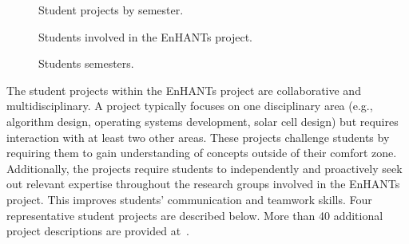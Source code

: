 \documentclass[journal,twopages]{IEEEtran}
\begin{document}
\begin{figure*}[t]
\centering
{}
\vspace*{-0.2cm}
\caption{\label{fig:studentsOverTime} Student projects by semester.}
\end{figure*}


\begin{figure}[t]
\centering
{}
\vspace*{-0.3cm}
\caption{\label{fig:studentBreakdown}Students involved in the EnHANTs project.}
\centering
\end{figure}

\begin{figure}[t]
\vspace*{-0.3cm}
\caption{\label{fig:studentSemesterBreakdown}Students semesters.}
\end{figure}


The student projects within the EnHANTs project are collaborative and multidisciplinary.
A project typically focuses on one disciplinary area (e.g., algorithm design, operating systems development, solar cell design) but requires interaction with at least two other areas. These projects challenge students by requiring them to gain understanding of concepts outside of their comfort zone. Additionally, the projects require students to independently and proactively seek out relevant expertise throughout the research groups involved in the EnHANTs project. This improves students' communication and teamwork skills.
Four representative student projects are described below. More than 40 additional project descriptions are provided at~\cite{EnHANTsProject}. 
\end{document}
